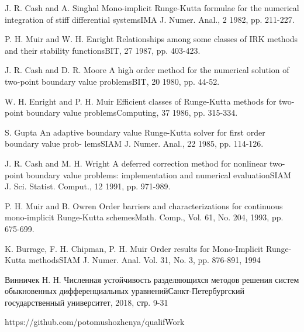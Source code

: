 \documentclass[a4paper,article,14pt]{extarticle}
\begin{document}
\begin{thebibliography}{1}
 J. R. Cash and A. Singhal \flqq Mono-implicit Runge-Kutta formulae for the numerical integration of stiff differential systems\frqq IMA J. Numer. Anal., 2 1982, pp. 211-227.

 P. H. Muir and W. H. Enright \flqq Relationships among some classes of IRK methods and their stability functions\frqq BIT, 27 1987, pp. 403-423.

 J. R. Cash and D. R. Moore \flqq A high order method for the numerical solution of two-point boundary value problems\frqq BIT, 20 1980, pp. 44-52.

 W. H. Enright and P. H. Muir \flqq Efficient classes of Runge-Kutta methods for two-point boundary value problems\frqq Computing, 37 1986, pp. 315-334.

 S. Gupta \flqq An adaptive boundary value Runge-Kutta solver for first order boundary value prob-
lems\frqq SIAM J. Numer. Anal., 22 1985, pp. 114-126.

 J. R. Cash and M. H. Wright \flqq A deferred correction method for nonlinear two-point boundary
value problems: implementation and numerical evaluation\frqq SIAM J. Sci. Statist. Comput., 12 1991, pp. 971-989.

 P. H. Muir and B. Owren \flqq Order barriers and characterizations for continuous mono-implicit
Runge-Kutta schemes\frqq Math. Comp., Vol. 61, No. 204, 1993, pp. 675-699.

 K. Burrage, F. H. Chipman, P. H. Muir \flqq Order results for Mono-Implicit Runge-Kutta methods\frqq SIAM J. Numer. Anal. Vol. 31, No. 3, pp. 876-891, 1994

 Винничек Н. Н. \flqq Численная устойчивость разделяющихся методов решения систем обыкновенных дифференциальных уравнений\frqq  Санкт-Петербургский государственный университет, 2018, стр. 9-31

 https://github.com/potomushozhenya/qualifWork
\end{thebibliography}
\pagebreak

\end{document}
